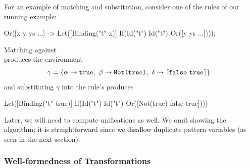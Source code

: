 For an example of matching and substitution, consider one of the rules of
our running  example:
\begin{Codes}
Or([x y ys ...] ->
  Let([Binding("t" x)]
      If(Id("t") Id("t") Or([y ys ...])));
\end{Codes}
Matching 
against \\ 
produces the environment
\[\gamma = \{
   \alpha \to \texttt{true},\
   \beta \to \texttt{Not(true)},\
   \delta \to \lceil \texttt{false}\ \texttt{true} \rceil\}\]
and substituting $\gamma$ into the rule's  produces
\begin{Codes}
Let([Binding("t" true)]
    If(Id("t") Id("t") Or([Not(true) false true])))
\end{Codes}

Later, we will need to compute unifications as well. We omit showing the
algorithm; it is straightforward since we disallow duplicate pattern variables (as
seen in the next section).

\subsubsection{Well-formedness of Transformations}
\label{sec:reval-wf}

